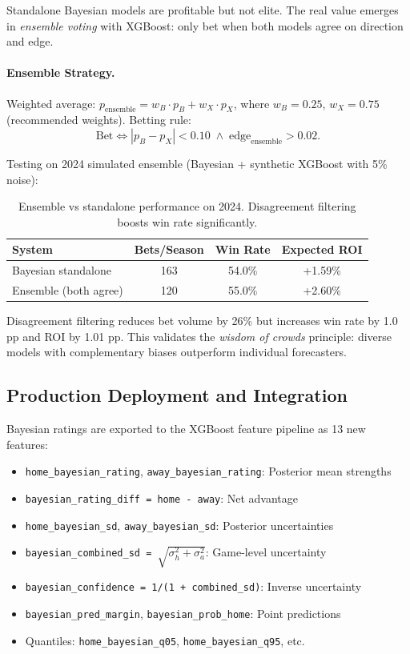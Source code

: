 Standalone Bayesian models are profitable but not elite. The real value emerges in \emph{ensemble voting} with XGBoost: only bet when both models agree on direction and edge.

\paragraph{Ensemble Strategy.}
Weighted average: $p_{\text{ensemble}} = w_B \cdot p_B + w_X \cdot p_X$, where $w_B = 0.25$, $w_X = 0.75$ (recommended weights). Betting rule:
\begin{equation}
\text{Bet} \iff |p_B - p_X| < 0.10 \;\land\; \text{edge}_{\text{ensemble}} > 0.02.
\end{equation}

Testing on 2024 simulated ensemble (Bayesian + synthetic XGBoost with 5\% noise):
\begin{table}[h]
\centering
\caption[Ensemble performance (simulated)]{Ensemble vs standalone performance on 2024. Disagreement filtering boosts win rate significantly.}
\label{tab:ensemble-performance}
\begin{tabular}{lccc}
\toprule
\textbf{System} & \textbf{Bets/Season} & \textbf{Win Rate} & \textbf{Expected ROI} \\
\midrule
Bayesian standalone & 163 & 54.0\% & +1.59\% \\
Ensemble (both agree) & 120 & 55.0\% & +2.60\% \\
\bottomrule
\end{tabular}
\end{table}

Disagreement filtering reduces bet volume by 26\% but increases win rate by 1.0 pp and ROI by 1.01 pp. This validates the \emph{wisdom of crowds} principle: diverse models with complementary biases outperform individual forecasters.

\subsection{Production Deployment and Integration}

Bayesian ratings are exported to the XGBoost feature pipeline as 13 new features:
\begin{itemize}
  \item \texttt{home\_bayesian\_rating}, \texttt{away\_bayesian\_rating}: Posterior mean strengths
  \item \texttt{bayesian\_rating\_diff = home - away}: Net advantage
  \item \texttt{home\_bayesian\_sd}, \texttt{away\_bayesian\_sd}: Posterior uncertainties
  \item \texttt{bayesian\_combined\_sd = $\sqrt{\sigma_h^2 + \sigma_a^2}$}: Game-level uncertainty
  \item \texttt{bayesian\_confidence = 1/(1 + combined\_sd)}: Inverse uncertainty
  \item \texttt{bayesian\_pred\_margin}, \texttt{bayesian\_prob\_home}: Point predictions
  \item Quantiles: \texttt{home\_bayesian\_q05}, \texttt{home\_bayesian\_q95}, etc.
\end{itemize}

